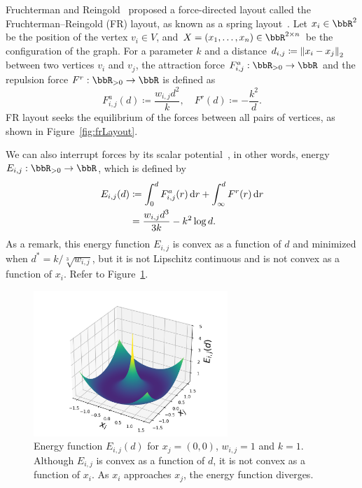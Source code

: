 \documentclass[dvipdfmx,lettersize,journal]{IEEEtran}
\newcommand{\defeq}{\coloneqq}
\begin{document}
Fruchterman and Reingold~\cite{fruchtermanGraphDrawingForcedirected1991} proposed a force-directed layout called the Fruchterman--Reingold (FR) layout, as known as a spring layout~\cite{osti_960616}.
Let $x_i \in \bbR^2$ be the position of the vertex $v_i \in V$, and $X = (x_1, \dots, x_n) \in \bbR^{2 \times n}$ be the configuration of the graph.
For a parameter $k$ and a distance $d_{i,j} \defeq \norm{x_i - x_j}_2$ between two vertices $v_i$ and $v_j$, the attraction force $F_{i,j}^a: \bbR_{> 0} \to \bbR$ and the repulsion force $F^r: \bbR_{> 0} \to \bbR$ is defined as
\begin{equation*}
  F_{i,j}^a(d) \defeq \frac{w_{i,j} d^2}{k}, \quad F^r(d) \defeq -\frac{k^2}{d}.
\end{equation*}
FR layout seeks the equilibrium of the forces between all pairs of vertices, as shown in Figure~\ref{fig:frLayout}.

We can also interrupt forces by its scalar potential~\cite{6183577}, in other words, energy $E_{i,j}: \bbR_{> 0} \to \bbR$, which is defined by
\begin{align}
  E_{i,j}(d) & \defeq \int_{0}^{d} F_{i,j}^a(r) \dd{r} + \int_{\infty}^{d} F^r(r) \dd{r} \notag \\
             & = \frac{w_{i,j} d^3}{3k} - k^2\log{d}. \label{eq:Eij}
\end{align}
As a remark, this energy function $E_{i,j}$ is convex as a function of $d$ and minimized when $d^* = k/\sqrt[3]{w_{i,j}}$, but it is not Lipschitz continuous and is not convex as a function of $x_i$. Refer to Figure~\ref{fig:energy3d}.

\begin{figure}[t]
  \centering
  \includegraphics[height=5.5cm]{energy_3d.png}
  \caption{Energy function $E_{i,j}(d)$ for $x_j=(0,0)$, $w_{i,j} = 1$ and $k = 1$. Although $E_{i,j}$ is convex as a function of $d$, it is not convex as a function of $x_i$. As $x_i$ approaches $x_j$, the energy function diverges.}
  \label{fig:energy3d}
\end{figure}
\end{document}
